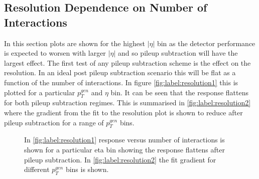 \subsection{Resolution Dependence on Number of Interactions}
In this section plots are shown for the highest $|\eta|$ bin as the detector performance is expected to worsen with larger $|\eta|$ and so pileup subtraction will have the largest effect. The first test of any pileup subtraction scheme is the effect on the resolution. In an ideal post pileup subtraction scenario this will be flat as a function of the number of interactions. In figure \ref{fig:label:resolution1} this is plotted for a particular $p^{gen}_T$ and $\eta$ bin. It can be seen that the response flattens for both pileup subtraction regimes. This is summarised in \ref{fig:label:resolution2} where the gradient from the fit to the resolution plot is shown to reduce after pileup subtraction for a range of $p^{gen}_T$ bins.  
\begin{figure}
\hfill
{}
\hfill
{}
\caption{In \ref{fig:label:resolution1} response versus number of interactions is shown for a particular eta bin showing the response flattens after pileup subtraction. In \ref{fig:label:resolution2} the fit gradient for different $p^{gen}_{T}$ bins is shown.}
\label{fig:label:resolution}
\end{figure}
